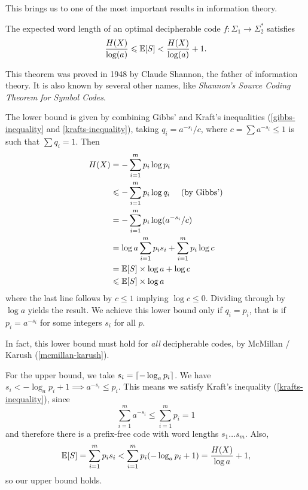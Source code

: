 \documentclass{article}
\begin{document}
This brings us to one of the most important results in information theory.

\begin{theorem}
	\label{shannon-noiseless-coding-theorem}
    The expected word length of an optimal decipherable code
    $f: \Sigma_1 \to \Sigma_2^*$ satisfies
    \[
	\frac{H(X)}{\log (a)}
	\leqslant \mathbb{E}[S] <
	\frac{H(X)}{\log (a)} + 1.
	\]
\end{theorem}

This theorem was proved in 1948 by Claude Shannon,
the father of information theory.
It is also known by several other names,
like \textit{Shannon's Source Coding Theorem for Symbol Codes}.

\begin{prf}
    The lower bound is given by combining Gibbs' and Kraft's inequalities
    (\ref{gibbs-inequality} and \ref{krafts-inequality}),
    taking $q_i = a^{-s_i}/c$,
    where $c = \sum a^{-s_i} \leq 1$
    is such that $\sum q_i = 1$. Then
    \begin{align*}
    	H(X) &= - \sum_{i=1}^m p_i \log p_i \\
    	&\leqslant - \sum_{i=1}^m p_i \log q_i \quad \text{ (by Gibbs')} \\
    	&= - \sum_{i=1}^m p_i \log (a^{-s_i}/c) \\
    	&= \log a \sum_{i=1}^m p_i s_i + \sum_{i=1}^m p_i \log c \\
    	&= \mathbb{E}[S] \times \log a + \log c \\
    	&\leqslant  \mathbb{E}[S] \times \log a
	\end{align*}
	where the last line follows by
	$c \leq 1$ implying $\log c \leq 0$.
	Dividing through by $\log a$ yields the result.
	We achieve this lower bound only if $q_i = p_i$,
	that is if $p_i = a^{-s_i}$ for some integers $s_i$ for all $p$.
	
	In fact, this lower bound must hold for \textit{all} decipherable codes,
	by McMillan / Karush (\ref{mcmillan-karush}).
	
	For the upper bound, we take
	$s_i = \left\lceil-\log_a p_i\right\rceil$.
	We have $s_i < - \log_a p_i + 1 \implies a^{-s_i} \leq p_i$.
	This means we satisfy Kraft's inequality (\ref{krafts-inequality}), since
	\[
	\sum_{i=1}^m a^{-s_i} \leq
	\sum_{i=1}^m p_i = 1
	\]
	and therefore there is a prefix-free code
	with word lengths $s_1 \dots s_m$. Also,
	\[
	\mathbb{E}[S] =
	\sum_{i=1}^m p_i s_i <
	\sum_{i=1}^m p_i (-\log_a p_i + 1) =
	\frac{H(X)}{\log a} + 1,
	\]
	so our upper bound holds.
\end{prf}
\end{document}
